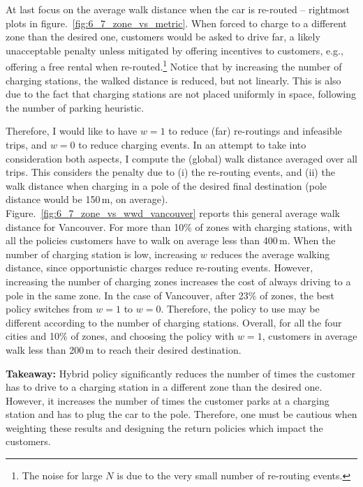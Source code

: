 At last focus on the average walk distance when the car is re-routed -- rightmost plots in figure.~\ref{fig:6_7_zone_vs_metric}. When forced to charge to a different zone than the desired one, customers would be asked to drive far, a likely unacceptable penalty unless mitigated by offering incentives to customers, e.g., offering a free rental when re-routed.\footnote{The noise for large $N$ is due to the very small number of re-routing events.} Notice that by increasing the number of charging stations, the walked distance is reduced, but not linearly. This is also due to the fact that charging stations are not placed uniformly in space, following the number of parking heuristic. 



Therefore, I would like to have $w=1$ to reduce (far) re-routings and infeasible trips, and $w=0$ to reduce charging events. In an attempt to take into consideration both aspects, I compute the (global) walk distance averaged over all trips. This considers the penalty due to (i) the re-routing events, and (ii) the walk distance when charging in a pole of the desired final destination (pole distance would be 150\,m, on average).
Figure.~\ref{fig:6_7_zone_vs_wwd_vancouver} reports this general average walk distance for Vancouver. For more than 10\% of zones with charging stations, with all the policies customers have to walk on average less than 400\,m.
When the number of charging station is low, increasing $w$ reduces the average walking distance, since opportunistic charges reduce re-routing events. However, increasing the number of charging zones increases the cost of always driving to a pole in the same zone. In the case of Vancouver, after 23\% of zones, the best policy switches from $w=1$ to $w=0$. Therefore, the policy to use may be different according to the number of charging stations. Overall, for all the four cities and 10\% of zones, and choosing the policy with $w=1$, customers in average walk less than 200\,m to reach their desired destination.

\textbf{Takeaway:} Hybrid policy significantly reduces the number of times the customer has to drive to a charging station in a different zone than the desired one. However, it increases the number of times the customer parks at a charging station and has to plug the car to the pole. Therefore, one must  be cautious when weighting these results and designing the return policies which impact the customers. 


